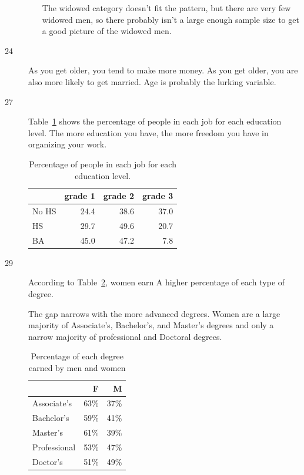 \documentclass[letterpaper, landscape]{exam}
\begin{document}
\begin{description}
\begin{enumerate}[(a)]
          The widowed category doesn't fit the pattern, but there are very few
          widowed men, so there probably isn't a large enough sample size to get a
          good picture of the widowed men.

        \end{enumerate}

    \item[24] As you get older, you tend to make more money.  As you get older, you
      are also more likely to get married.  Age is probably the lurking variable.

    \item[27]
      Table~\ref{tab:ex27} shows the percentage of people in each job for each
      education level.  The more education you have, the more freedom you have
      in organizing your work.

      \begin{table}[H]
        \centering
        \begin{tabular}{lrrr}
          \toprule
                & grade 1 & grade 2 & grade 3     \\
          \midrule
          No HS & 24.4    & 38.6    & 37.0 \\
          HS    & 29.7    & 49.6    & 20.7 \\
          BA    & 45.0    & 47.2    & 7.8  \\
          \bottomrule
        \end{tabular}
        \caption{Percentage of people in each job for each education level.}\label{tab:ex27}
      \end{table}

    \newpage

    \item[29]
      According to Table~\ref{tab:ex29}, women earn A higher percentage of each
      type of degree.  
      
      The gap narrows with the more advanced degrees. Women are a large majority
      of Associate's, Bachelor's, and Master's degrees and only a narrow
      majority of professional and Doctoral degrees.

      \begin{table}[H]
        \centering
        \begin{tabular}{lrr}
          \toprule
                       & F    & M \\
          \midrule
          Associate's  & 63\% & 37\% \\
          Bachelor's   & 59\% & 41\% \\
          Master's     & 61\% & 39\% \\
          Professional & 53\% & 47\% \\
          Doctor's     & 51\% & 49\% \\
          \bottomrule
        \end{tabular}
        \caption{Percentage of each degree earned by men and women}\label{tab:ex29}
      \end{table}


\end{description}
\end{document}
